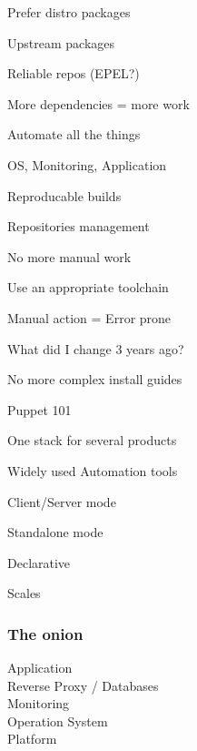 \begin{iframe}[Dependencies]
\item{Prefer distro packages}
\item{Upstream packages}
\item{Reliable repos (EPEL?)}
\item{More dependencies = more work}
\end{iframe}


\begin{iframe}[Automation]
\item Automate all the things
\item OS, Monitoring, Application
\item Reproducable builds
\item Repositories management
\end{iframe}
\begin{iframe}
\item No more manual work
\item Use an appropriate toolchain
\item Manual action = Error prone
\item What did I change 3 years ago?
\end{iframe}

\begin{iframe}[Documentation]
\item No more complex install guides
\item Puppet 101
\item One stack for several products
\end{iframe}

\begin{iframe}[Puppet]
\item Widely used Automation tools
\item Client/Server mode
\item Standalone mode
\item Declarative
\item Scales
\end{iframe}

\begin{frame}
    \frametitle{The onion}
    \huge
    Application\\
    Reverse Proxy / Databases\\
    Monitoring\\
    Operation System\\
    Platform
\end{frame}

